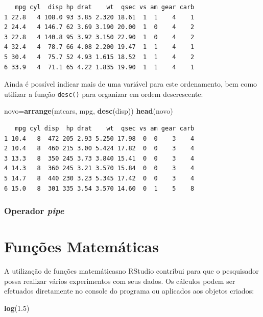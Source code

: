 \documentclass[12pt,brazil,oneside]{book}
\newenvironment{Shaded}{\begin{snugshade}}{\end{snugshade}}
\newcommand{\FloatTok}[1]{\textcolor[rgb]{0.00,0.00,0.81}{#1}}
\newcommand{\KeywordTok}[1]{\textcolor[rgb]{0.13,0.29,0.53}{\textbf{#1}}}
\newcommand{\NormalTok}[1]{#1}
\begin{document}
\begin{verbatim}
   mpg cyl  disp hp drat    wt  qsec vs am gear carb
1 22.8   4 108.0 93 3.85 2.320 18.61  1  1    4    1
2 24.4   4 146.7 62 3.69 3.190 20.00  1  0    4    2
3 22.8   4 140.8 95 3.92 3.150 22.90  1  0    4    2
4 32.4   4  78.7 66 4.08 2.200 19.47  1  1    4    1
5 30.4   4  75.7 52 4.93 1.615 18.52  1  1    4    2
6 33.9   4  71.1 65 4.22 1.835 19.90  1  1    4    1
\end{verbatim}

Ainda é possível indicar mais de uma variável para este ordenamento, bem como utilizar a função \texttt{desc()} para organizar em ordem descrescente:

\begin{Shaded}
\begin{Highlighting}[]
\NormalTok{novo=}\KeywordTok{arrange}\NormalTok{(mtcars, mpg, }\KeywordTok{desc}\NormalTok{(disp))}
\KeywordTok{head}\NormalTok{(novo)}
\end{Highlighting}
\end{Shaded}

\begin{verbatim}
   mpg cyl disp  hp drat    wt  qsec vs am gear carb
1 10.4   8  472 205 2.93 5.250 17.98  0  0    3    4
2 10.4   8  460 215 3.00 5.424 17.82  0  0    3    4
3 13.3   8  350 245 3.73 3.840 15.41  0  0    3    4
4 14.3   8  360 245 3.21 3.570 15.84  0  0    3    4
5 14.7   8  440 230 3.23 5.345 17.42  0  0    3    4
6 15.0   8  301 335 3.54 3.570 14.60  0  1    5    8
\end{verbatim}

\hypertarget{operador-pipe}{%
\subsubsection{\texorpdfstring{Operador \emph{pipe}}{Operador pipe}}\label{operador-pipe}}

\hypertarget{funcoes-matematicas}{%
\section{Funções Matemáticas}\label{funcoes-matematicas}}

A utilização de funções matemáticasno RStudio contribui para que o pesquisador possa realizar vários experimentos com seus dados. Os cálculos podem ser efetuados diretamente no console do programa ou aplicados aos objetos criados:

\begin{Shaded}
\begin{Highlighting}[]
\KeywordTok{log}\NormalTok{(}\FloatTok{1.5}\NormalTok{)}
\end{Highlighting}
\end{Shaded}
\end{document}
